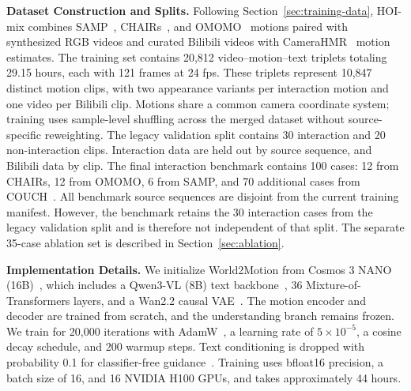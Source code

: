 \noindent\textbf{Dataset Construction and Splits.} Following Section~\ref{sec:training-data}, HOI-mix combines SAMP~\citep{hassan2021samp}, CHAIRs~\citep{jiang2023chairs}, and OMOMO~\citep{li2023omomo} motions paired with synthesized RGB videos and curated Bilibili videos with CameraHMR~\citep{patel2025camerahmr} motion estimates. The training set contains 20,812 video--motion--text triplets totaling 29.15 hours, each with 121 frames at 24 fps. These triplets represent 10,847 distinct motion clips, with two appearance variants per interaction motion and one video per Bilibili clip. Motions share a common camera coordinate system; training uses sample-level shuffling across the merged dataset without source-specific reweighting. The legacy validation split contains 30 interaction and 20 non-interaction clips. Interaction data are held out by source sequence, and Bilibili data by clip. The final interaction benchmark contains 100 cases: 12 from CHAIRs, 12 from OMOMO, 6 from SAMP, and 70 additional cases from COUCH~\citep{zhang2022couch}. All benchmark source sequences are disjoint from the current training manifest. However, the benchmark retains the 30 interaction cases from the legacy validation split and is therefore not independent of that split. The separate 35-case ablation set is described in Section~\ref{sec:ablation}.

\noindent\textbf{Implementation Details.} We initialize World2Motion from Cosmos 3 NANO (16B)~\citep{agarwal2026cosmos}, which includes a Qwen3-VL (8B) text backbone~\citep{bai2025qwen3}, 36 Mixture-of-Transformers layers, and a Wan2.2 causal VAE~\citep{wan2025wan}. The motion encoder and decoder are trained from scratch, and the understanding branch remains frozen. We train for 20,000 iterations with AdamW~\citep{loshchilov2019decoupled}, a learning rate of $5\times10^{-5}$, a cosine decay schedule, and 200 warmup steps. Text conditioning is dropped with probability 0.1 for classifier-free guidance~\citep{ho2022classifierfree}. Training uses bfloat16 precision, a batch size of 16, and 16 NVIDIA H100 GPUs, and takes approximately 44 hours.


